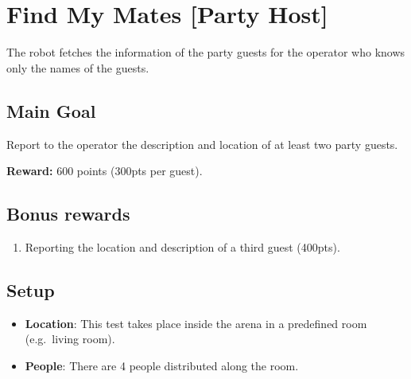 \section{Find My Mates [Party Host]}
\label{test:find-my-mates}
The robot fetches the information of the party guests for the operator who knows only the names of the guests.


\subsection*{Main Goal}
Report to the operator the description and location of at least two party guests.

\noindent\textbf{Reward:} 600 points (300pts per guest).

\subsection*{Bonus rewards}
\begin{enumerate}[nosep]
	\item Reporting the location and description of a third guest (400pts).
\end{enumerate}


\subsection*{Setup}
\begin{itemize}
	\item \textbf{Location}: This test takes place inside the arena in a predefined room (e.g.~living room).

	\item \textbf{People}: There are 4 people distributed along the room.
\end{itemize}

